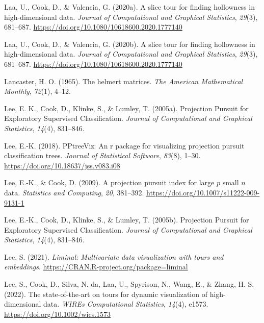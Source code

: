 \documentclass[
  letterpaper,
]{book}
\newlength{\cslhangindent}
\newlength{\cslentryspacingunit} %
\newenvironment{CSLReferences}[2] %
 {%
  \setlength{\parindent}{0pt}
  \ifodd #1
  \let\oldpar\par
  \def\par{\hangindent=\cslhangindent\oldpar}
  \fi
  \setlength{\parskip}{#2\cslentryspacingunit}
 }%
 {}
\begin{document}
\begin{CSLReferences}{1}{0}
\leavevmode{}%
Laa, U., Cook, D., \& Valencia, G. (2020a). A slice tour for finding
hollowness in high-dimensional data. \emph{Journal of Computational and
Graphical Statistics}, \emph{29}(3), 681--687.
\url{https://doi.org/10.1080/10618600.2020.1777140}

\leavevmode{}%
Laa, U., Cook, D., \& Valencia, G. (2020b). A slice tour for finding
hollowness in high-dimensional data. \emph{Journal of Computational and
Graphical Statistics}, \emph{29}(3), 681--687.
\url{https://doi.org/10.1080/10618600.2020.1777140}

\leavevmode{}%
Lancaster, H. O. (1965). The helmert matrices. \emph{The American
Mathematical Monthly}, \emph{72}(1), 4--12.

\leavevmode{}%
Lee, E. K., Cook, D., Klinke, S., \& Lumley, T. (2005a). Projection
{P}ursuit for {E}xploratory {S}upervised {C}lassification. \emph{Journal
of Computational and Graphical Statistics}, \emph{14}(4), 831--846.

\leavevmode{}%
Lee, E.-K. (2018). PPtreeViz: An r package for visualizing projection
pursuit classification trees. \emph{Journal of Statistical Software},
\emph{83}(8), 1--30. \url{https://doi.org/10.18637/jss.v083.i08}

\leavevmode{}%
Lee, E.-K., \& Cook, D. (2009). A projection pursuit index for large
\(p\) small \(n\) data. \emph{Statistics and Computing}, \emph{20},
381--392. \url{https://doi.org/10.1007/s11222-009-9131-1}

\leavevmode{}%
Lee, E.-K., Cook, D., Klinke, S., \& Lumley, T. (2005b). {P}rojection
{P}ursuit for {E}xploratory {S}upervised {C}lassification. \emph{Journal
of Computational and Graphical Statistics}, \emph{14}(4), 831--846.

\leavevmode{}%
Lee, S. (2021). \emph{Liminal: Multivariate data visualization with
tours and embeddings}. \url{https://CRAN.R-project.org/package=liminal}

\leavevmode{}%
Lee, S., Cook, D., Silva, N. da, Laa, U., Spyrison, N., Wang, E., \&
Zhang, H. S. (2022). The state-of-the-art on tours for dynamic
visualization of high-dimensional data. \emph{WIREs Computational
Statistics}, \emph{14}(4), e1573.
\url{https://doi.org/10.1002/wics.1573}


\end{CSLReferences}
\end{document}
